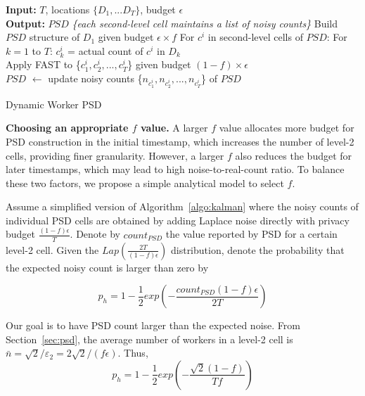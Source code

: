 \documentclass{USC-Thesis}
\numberwithin{equation}{chapter}
\begin{document}
\begin{algorithm}[ht]
\small
\begin{algorithmic}[1]
\STATE \textbf{Input:} $T$, locations $\{D_1,...D_T\}$, budget $\epsilon$\\
\STATE \textbf{Output:} $\mathit{PSD}$ \textit{\{each second-level cell maintains a list of noisy counts\}}
\STATE Build $\mathit{PSD}$ structure of $D_1$ given budget $\epsilon \times f$ \label{line:ag_structure}
\STATE For $c^i$ in second-level cells of $\mathit{PSD}$: \label{line:each_2ndcell}
\STATE \hspace*{4mm} For $k=1$ to $T$:
\STATE \hspace*{8mm} $c_k^i$ = actual count of $c^i$ in $D_k$ \\
\STATE \hspace*{4mm} Apply FAST to \{$c_1^i,c_2^i,...,c_T^i$\} given budget $(1-f) \times \epsilon$ \\ \label{line:apply_fast}
\STATE \hspace*{4mm} $\mathit{PSD}$ $\leftarrow$ update noisy counts \{$n_{c_1^i},n_{c_2^i},...,n_{c_T^i}$\} of $\mathit{PSD}$
\end{algorithmic}
\caption{Dynamic Worker PSD} \label{algo:kalman}
\end{algorithm}

\noindent
\textbf {Choosing an appropriate $f$ value.}
A larger $f$ value allocates more budget for PSD construction in the initial timestamp, which increases the number of level-2 cells, providing finer granularity. However, a larger $f$ also reduces the budget for later timestamps, which may lead to high noise-to-real-count ratio. To balance these two factors, we propose a simple analytical model to select $f$.

Assume a simplified version of Algorithm~\ref{algo:kalman} where the noisy counts of individual PSD cells are obtained by adding Laplace noise directly with privacy budget $\frac{(1-f)\epsilon}{T}$. Denote by $count_{PSD}$ the value reported by PSD for a certain level-2 cell. Given the $Lap(\frac{2T}{(1-f)\epsilon})$ distribution, denote the probability that the expected noisy count is larger than zero by

$$p_h=1-\frac{1}{2}exp(-\frac{count_{PSD}(1-f)\epsilon}{2T})$$

Our goal is to have PSD count larger than the expected noise. From Section~\ref{sec:psd}, the average number of workers in a level-2 cell is $\bar{n}=\sqrt{2}/\varepsilon_2=2\sqrt{2}/(f\epsilon)$. Thus, $$p_h=1-\frac{1}{2}exp(-\frac{\sqrt{2}(1-f)}{Tf})$$
\end{document}
